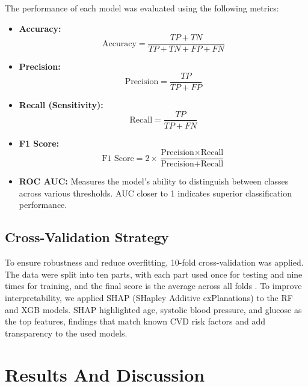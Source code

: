 \documentclass[conference]{IEEEtran}
\begin{document}
The performance of each model was evaluated using the following metrics:

\begin{itemize}
    \item \textbf{Accuracy:}
    \begin{equation}
    \text{Accuracy} = \frac{TP + TN}{TP + TN + FP + FN}
    \end{equation}
    
    \item \textbf{Precision:}
    \begin{equation}
    \text{Precision} = \frac{TP}{TP + FP}
    \end{equation}
    
    \item \textbf{Recall (Sensitivity):}
    \begin{equation}
    \text{Recall} = \frac{TP}{TP + FN}
    \end{equation}
    
    \item \textbf{F1 Score:}
    \begin{equation}
    \text{F1 Score} = 2 \times \frac{\text{Precision} \times \text{Recall}}{\text{Precision} + \text{Recall}}
    \end{equation}
    
    \item \textbf{ROC AUC:} Measures the model's ability to distinguish between classes across various thresholds. AUC closer to 1 indicates superior classification performance.
\end{itemize}

\subsection{\textbf{Cross-Validation Strategy}}

To ensure robustness and reduce overfitting, 10-fold cross-validation was applied. The data were split into ten parts, with each part used once for testing and nine times for training, and the final score is the average across all folds \cite{s4}. To improve interpretability, we applied SHAP (SHapley Additive exPlanations) to the RF and XGB models. SHAP highlighted age, systolic blood pressure, and glucose as the top features, findings that match known CVD risk factors and add transparency to the used models.

\section{Results And Discussion}
\end{document}
